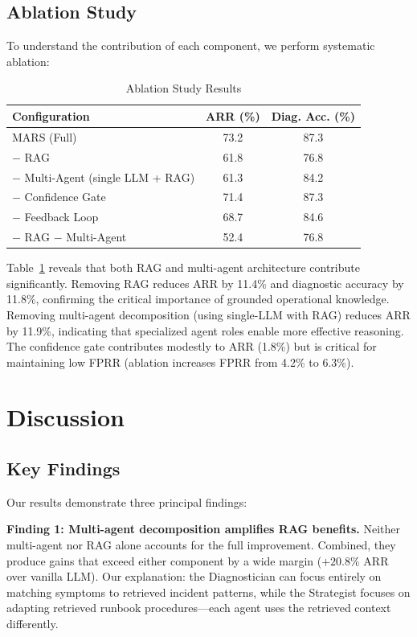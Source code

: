 \documentclass[journal]{IEEEtran}
\begin{document}
\subsection{Ablation Study}

To understand the contribution of each component, we perform systematic ablation:

\begin{table}[t]
\centering
\caption{Ablation Study Results}
\label{tab:ablation}
\begin{tabular}{@{}lcc@{}}
\toprule
\textbf{Configuration} & \textbf{ARR (\%)} & \textbf{Diag. Acc. (\%)} \\
\midrule
MARS (Full) & 73.2 & 87.3 \\
\quad $-$ RAG & 61.8 & 76.8 \\
\quad $-$ Multi-Agent (single LLM + RAG) & 61.3 & 84.2 \\
\quad $-$ Confidence Gate & 71.4 & 87.3 \\
\quad $-$ Feedback Loop & 68.7 & 84.6 \\
\quad $-$ RAG $-$ Multi-Agent & 52.4 & 76.8 \\
\bottomrule
\end{tabular}
\end{table}

Table~\ref{tab:ablation} reveals that both RAG and multi-agent architecture contribute significantly. Removing RAG reduces ARR by 11.4\% and diagnostic accuracy by 11.8\%, confirming the critical importance of grounded operational knowledge. Removing multi-agent decomposition (using single-LLM with RAG) reduces ARR by 11.9\%, indicating that specialized agent roles enable more effective reasoning. The confidence gate contributes modestly to ARR (1.8\%) but is critical for maintaining low FPRR (ablation increases FPRR from 4.2\% to 6.3\%).

\section{Discussion}
\label{sec:discussion}

\subsection{Key Findings}

Our results demonstrate three principal findings:

\textbf{Finding 1: Multi-agent decomposition amplifies RAG benefits.} Neither multi-agent nor RAG alone accounts for the full improvement. Combined, they produce gains that exceed either component by a wide margin ($+20.8\%$ ARR over vanilla LLM). Our explanation: the Diagnostician can focus entirely on matching symptoms to retrieved incident patterns, while the Strategist focuses on adapting retrieved runbook procedures---each agent uses the retrieved context differently.
\end{document}
